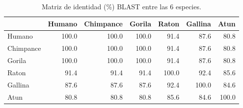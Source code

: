 \begin{table}[h]
\centering
\small
\caption{Matriz de identidad (\%) BLAST entre las 6 especies.}
\begin{tabular}{lrrrrrr}
\toprule
 & Humano & Chimpance & Gorila & Raton & Gallina & Atun \\
\midrule
Humano & 100.0 & 100.0 & 100.0 & 91.4 & 87.6 & 80.8 \\
Chimpance & 100.0 & 100.0 & 100.0 & 91.4 & 87.6 & 80.8 \\
Gorila & 100.0 & 100.0 & 100.0 & 91.4 & 87.6 & 80.8 \\
Raton & 91.4 & 91.4 & 91.4 & 100.0 & 92.4 & 85.6 \\
Gallina & 87.6 & 87.6 & 87.6 & 92.4 & 100.0 & 84.6 \\
Atun & 80.8 & 80.8 & 80.8 & 85.6 & 84.6 & 100.0 \\
\bottomrule
\end{tabular}
\end{table}